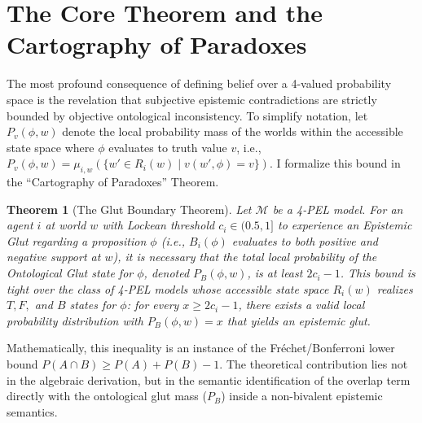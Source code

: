 \documentclass[11pt,a4paper]{article}
\newtheorem{theorem}{Theorem}[section]
\begin{document}
\section{The Core Theorem and the Cartography of Paradoxes}
\label{sec:theorem}

The most profound consequence of defining belief over a 4-valued probability space is the revelation that subjective epistemic contradictions are strictly bounded by objective ontological inconsistency. To simplify notation, let $P_v(\phi, w)$ denote the local probability mass of the worlds within the accessible state space where $\phi$ evaluates to truth value $v$, i.e., $P_v(\phi, w) = \mu_{i,w}(\{w' \in R_i(w) \mid v(w', \phi) = v\})$. I formalize this bound in the ``Cartography of Paradoxes'' Theorem.

\begin{theorem}[The Glut Boundary Theorem]
Let $\mathcal{M}$ be a 4-PEL model. For an agent $i$ at world $w$ with Lockean threshold $c_i \in (0.5, 1]$ to experience an Epistemic Glut regarding a proposition $\phi$ (i.e., $B_i(\phi)$ evaluates to both positive and negative support at $w$), it is necessary that the total local probability of the Ontological Glut state for $\phi$, denoted $P_B(\phi, w)$, is at least $2c_i - 1$. This bound is tight over the class of 4-PEL models whose accessible state space $R_i(w)$ realizes $T, F,$ and $B$ states for $\phi$: for every $x \ge 2c_i - 1$, there exists a valid local probability distribution with $P_B(\phi, w) = x$ that yields an epistemic glut.
\end{theorem}

Mathematically, this inequality is an instance of the Fr\'echet/Bonferroni lower bound $P(A \cap B) \ge P(A) + P(B) - 1$. The theoretical contribution lies not in the algebraic derivation, but in the semantic identification of the overlap term directly with the ontological glut mass ($P_B$) inside a non-bivalent epistemic semantics.
\end{document}
